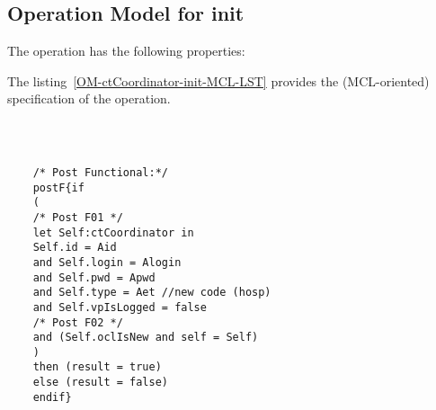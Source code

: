 \subsection{Operation Model for init}

\label{OM-init}


The  operation has the following properties:

	\begin{operationmodel}



		


	\end{operationmodel}



	\vspace{1cm}
	The listing~\ref{OM-ctCoordinator-init-MCL-LST} provides the \msrmessir (MCL-oriented) specification of the operation.
	
	\scriptsize
	\vspace{0.5cm}
	\begin{lstlisting}[style=MessirStyle,firstnumber=auto,captionpos=b,caption={\msrmessir (MCL-oriented) specification of the operation \emph{init}.},label=OM-ctCoordinator-init-MCL-LST]

	
	
	/* Post Functional:*/ 
	postF{if
	(
	/* Post F01 */
	let Self:ctCoordinator in
	Self.id = Aid
	and Self.login = Alogin
	and Self.pwd = Apwd
	and Self.type = Aet //new code (hosp)
	and Self.vpIsLogged = false
	/* Post F02 */
	and (Self.oclIsNew and self = Self)
	)
	then (result = true)
	else (result = false)
	endif}
	
	
	\end{lstlisting}
	\normalsize 
	
